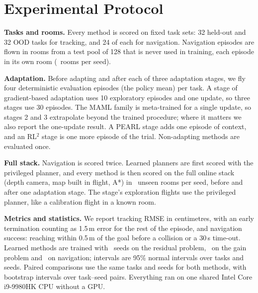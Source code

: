 \section{Experimental Protocol}\label{sec:protocol}

\textbf{Tasks and rooms.} Every method is scored on fixed task sets: 32 held-out and 32 OOD tasks for tracking, and 24 of each for navigation. Navigation episodes are flown in rooms from a test pool of 128 that is never used in training, each episode in its own room (\valNavPrivRooms\ rooms per seed).

\textbf{Adaptation.} Before adapting and after each of three adaptation stages, we fly four deterministic evaluation episodes (the policy mean) per task. A stage of gradient-based adaptation uses 10 exploratory episodes and one update, so three stages use 30 episodes. The MAML family is meta-trained for a single update, so stages 2 and 3 extrapolate beyond the trained procedure; where it matters we also report the one-update result. A PEARL stage adds one episode of context, and an RL$^2$ stage is one more episode of the trial. Non-adapting methods are evaluated once.

\textbf{Full stack.} Navigation is scored twice. Learned planners are first scored with the privileged planner, and every method is then scored on the full online stack (depth camera, map built in flight, A*) in \valNavFullRooms\ unseen rooms per seed, before and after one adaptation stage. The stage's exploration flights use the privileged planner, like a calibration flight in a known room.

\textbf{Metrics and statistics.} We report tracking RMSE in centimetres, with an early termination counting as 1.5\,m error for the rest of the episode, and navigation success: reaching within 0.5\,m of the goal before a collision or a 30\,s time-out. Learned methods are trained with \valSeedsRes\ seeds on the residual problem, \valSeedsGain\ on the gain problem and \valSeedsNav\ on navigation; intervals are 95\% normal intervals over tasks and seeds. Paired comparisons use the same tasks and seeds for both methods, with bootstrap intervals over task--seed pairs. Everything ran on one shared Intel Core i9-9980HK CPU without a GPU.

